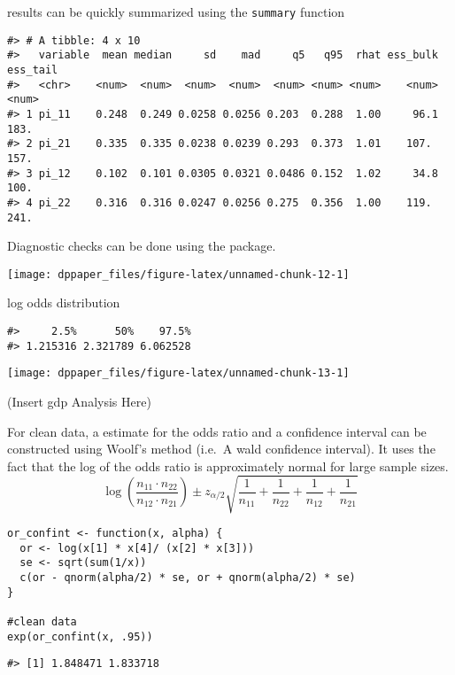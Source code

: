 results can be quickly summarized using the \texttt{summary} function

\begin{verbatim}
#> # A tibble: 4 x 10
#>   variable  mean median     sd    mad     q5   q95  rhat ess_bulk ess_tail
#>   <chr>    <num>  <num>  <num>  <num>  <num> <num> <num>    <num>    <num>
#> 1 pi_11    0.248  0.249 0.0258 0.0256 0.203  0.288  1.00     96.1     183.
#> 2 pi_21    0.335  0.335 0.0238 0.0239 0.293  0.373  1.01    107.      157.
#> 3 pi_12    0.102  0.101 0.0305 0.0321 0.0486 0.152  1.02     34.8     100.
#> 4 pi_22    0.316  0.316 0.0247 0.0256 0.275  0.356  1.00    119.      241.
\end{verbatim}

Diagnostic checks can be done using the  package.

\begin{center}\texttt{[image: dppaper\_files/figure-latex/unnamed-chunk-12-1]} \end{center}

log odds distribution

\begin{verbatim}
#>     2.5%      50%    97.5% 
#> 1.215316 2.321789 6.062528
\end{verbatim}

\begin{center}\texttt{[image: dppaper\_files/figure-latex/unnamed-chunk-13-1]} \end{center}

(Insert gdp Analysis Here)

For clean data, a estimate for the odds ratio and a confidence interval
can be constructed using Woolf's method (i.e.~A wald confidence interval).
It uses the fact that the log of the odds ratio is approximately
normal for large sample sizes.
\[
\log\left(\dfrac{n_{11} \cdot n_{22}}{n_{12} \cdot n_{21}}\right) 
  \pm z_{\alpha/2}\sqrt{\dfrac{1}{n_{11}} + \dfrac{1}{n_{22}} + \dfrac{1}{n_{12}} + \dfrac{1}{n_{21}}}
\]

\begin{verbatim}
or_confint <- function(x, alpha) {
  or <- log(x[1] * x[4]/ (x[2] * x[3]))
  se <- sqrt(sum(1/x))
  c(or - qnorm(alpha/2) * se, or + qnorm(alpha/2) * se)
}

#clean data
exp(or_confint(x, .95))
\end{verbatim}

\begin{verbatim}
#> [1] 1.848471 1.833718
\end{verbatim}

